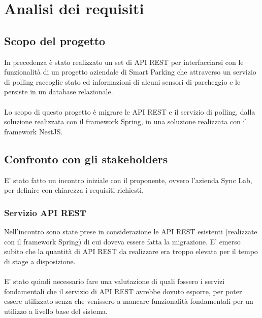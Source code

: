 
\chapter{Analisi dei requisiti}
\label{cap:analisi-requisiti}

\section{Scopo del progetto}
In precedenza è stato realizzato un set di \gls{API} \gls{REST} per interfacciarsi con le funzionalità
di un progetto aziendale di Smart Parking che attraverso un servizio di polling raccoglie 
stato ed informazioni di alcuni sensori di parcheggio e le persiste in un database relazionale.
\\\\
Lo scopo di questo progetto è migrare le \gls{API} \gls{REST} e il servizio di polling, dalla soluzione
realizzata con il framework Spring, in una soluzione realizzata con il framework NestJS.

\section{Confronto con gli stakeholders}
E' stato fatto un incontro iniziale con il proponente, ovvero l'azienda Sync Lab,
per definire con chiarezza i requisiti richiesti.
\subsection{Servizio API REST}
Nell'incontro sono state prese in considerazione le \gls{API} \gls{REST} esistenti (realizzate con il framework Spring) 
di cui doveva essere fatta la migrazione.
E' emerso subito che la quantità di \gls{API} \gls{REST} da realizzare era troppo elevata per il
tempo di stage a disposizione. 
\\\\
E' stato quindi necessario fare una valutazione di quali fossero i servizi fondamentali che
il servizio di \gls{API} \gls{REST} avrebbe dovuto esporre, per poter essere utilizzato senza che venissero
a mancare funzionalità fondamentali per un utilizzo a livello base del sistema.

